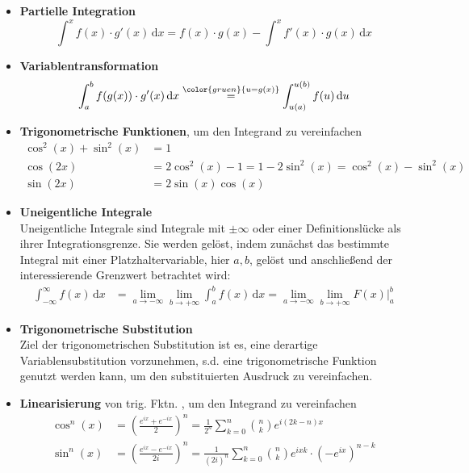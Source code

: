 \documentclass{article}
\newcommand{\diff}{\mathrm{d}}
\newcommand{\lr}[1]{\left(#1\right)}
\newcommand{\commentmath}[1]{{\color{gruen}{#1}}}
\begin{document}
\begin{itemize}
	\item \textbf{Partielle Integration}\\
		\begin{equation}
			\int^x f(x)\cdot g'(x)\,\diff x = f(x) \cdot g(x) - \int^x f'(x) \cdot g(x)\,\diff x
		\end{equation}
		
	
	\item \textbf{Variablentransformation}
		\begin{equation}
			\int_a^b f(g(x)) \cdot g'(x) \, \diff x \stackrel{\commentmath{u = g(x)}}{=} \int_{u(a)}^{u(b)} f(u) \, \diff u
		\end{equation}


	\item \textbf{Trigonometrische Funktionen}, um den Integrand zu vereinfachen
		\begin{align}
			\cos^2(x) + \sin^2(x) &= 1\\
			\cos(2x) &= 2\cos^2(x) -1 = 1 - 2\sin^2(x) = \cos^2(x) - \sin^2(x)\\
			\sin(2x) &= 2\sin(x)\cos(x)
		\end{align}


	\item \textbf{Uneigentliche Integrale}\\
	Uneigentliche Integrale sind Integrale mit $\pm\infty$ oder einer Definitionslücke als ihrer Integrationsgrenze. Sie werden gelöst, indem zunächst das bestimmte Integral mit einer Platzhaltervariable, hier $a,b$, gelöst und anschließend der interessierende Grenzwert betrachtet wird:
		\begin{align}
			\int_{-\infty}^\infty f(x) \, \diff x &= \lim\limits_{a\to-\infty}\lim\limits_{b\to+\infty} \int_a^b f(x) \, \diff x = \lim\limits_{a\to-\infty}\lim\limits_{b\to+\infty} \left. F(x) \right|_a^b
		\end{align}


	\item \textbf{Trigonometrische Substitution}\\
	Ziel der trigonometrischen Substitution ist es, eine derartige Variablensubstitution vorzunehmen, s.d. eine trigonometrische Funktion genutzt werden kann, um den substituierten Ausdruck zu vereinfachen.
		
	
	\item \textbf{Linearisierung} von trig. Fktn. , um den Integrand zu vereinfachen
		\begin{align}
			\cos^n(x) &= \lr{\frac{e^{ix} + e^{-ix}}{2}}^n = \frac{1}{2^n} \sum_{k=0}^n \binom{n}{k} e^{i(2k - n)x} \\
			\sin^n(x) &= \lr{\frac{e^{ix} - e^{-ix}}{2i}}^n = \frac{1}{(2i)^n} \sum_{k=0}^n \binom{n}{k} e^{ix k} \cdot (-e^{ix})^{n-k}
		\end{align}



\end{itemize}
\end{document}
